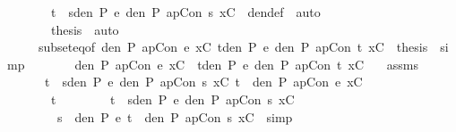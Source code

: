 \documentclass{llncs}
\newenvironment{isacode}
{\begin{list}{}{
\setlength{\leftmargin}{4pt}
\setlength{\rightmargin}{0pt}
\setlength{\listparindent}{0pt}\raggedright
\setlength{\itemsep}{0pt}
\setlength{\parsep}{0pt}
\normalfont\ttfamily }\item[]}
{\end{list}}
\begin{document}
{\begin{isacode}
\ \ \ \ \ \ \isamarkupfalse \ {\isachardoublequoteopen}t\ {\isasymin}\ {\isacharparenleft}{\isasymUnion}s{\isasymin}den\ P\ e{\isachardot}\ den\ P\ {\isacharparenleft}apCon\ s\ xC{\isacharparenright}{\isacharparenright}{\isachardoublequoteclose}\ \isamarkupfalse \ den{\isacharunderscore}def\ \isamarkupfalse \ auto\isanewline
\ \ \ \ \ \isacommand{{\isacharbraceright}}\isamarkupfalse \isanewline
\ \ \ \ \ \ \isamarkupfalse \ {\isacharquery}thesis\ \isamarkupfalse \ auto\isanewline
\ \ \ \ \isamarkupfalse \isanewline
\ \ \ \ \isamarkupfalse \ subset{\isacharunderscore}eq{\isacharbrackleft}of\ {\isachardoublequoteopen}den\ P\ {\isacharparenleft}apCon\ e\ xC{\isacharparenright}{\isachardoublequoteclose}\ {\isachardoublequoteopen}{\isasymUnion}t{\isasymin}den\ P\ e{\isachardot}\ den\ P\ {\isacharparenleft}apCon\ t\ xC{\isacharparenright}{\isachardoublequoteclose}{\isacharbrackright}\ \isamarkupfalse \ {\isacharquery}thesis\ \isamarkupfalse \ simp\isanewline
\ \ \isamarkupfalse \isanewline
\ \isamarkupfalse \isanewline
\ \ \isamarkupfalse \ {\isachardoublequoteopen}den\ P\ {\isacharparenleft}apCon\ e\ xC{\isacharparenright}\ {\isasymsupseteq}\ {\isacharparenleft}{\isasymUnion}t{\isasymin}den\ P\ e{\isachardot}\ den\ P\ {\isacharparenleft}apCon\ t\ xC{\isacharparenright}{\isacharparenright}{\isachardoublequoteclose}\isanewline
\ \ \isamarkupfalse \ assms\isanewline
\ \ \isamarkupfalse \ {\isacharminus}\isanewline
\ \ \ \ \isamarkupfalse \ {\isachardoublequoteopen}{\isasymforall}\ t\ {\isasymin}\ {\isacharparenleft}{\isasymUnion}s{\isasymin}den\ P\ e{\isachardot}\ den\ P\ {\isacharparenleft}apCon\ s\ xC{\isacharparenright}{\isacharparenright}{\isachardot}\ t\ {\isasymin}\ den\ P\ {\isacharparenleft}apCon\ e\ xC{\isacharparenright}{\isachardoublequoteclose}\isanewline
\ \ \ \ \isamarkupfalse \ {\isacharminus}\isanewline
\ \ \ \ \ \isacommand{{\isacharbraceleft}}\isamarkupfalse \isanewline
\ \ \ \ \ \ \isamarkupfalse \ t\isanewline
\ \ \ \ \ \ \isamarkupfalse \ \ {\isachardoublequoteopen}t\ {\isasymin}\ {\isacharparenleft}{\isasymUnion}s{\isasymin}den\ P\ e{\isachardot}\ den\ P\ {\isacharparenleft}apCon\ s\ xC{\isacharparenright}{\isacharparenright}{\isachardoublequoteclose}\isanewline
\ \ \ \ \ \ \isamarkupfalse \ {\isachardoublequoteopen}{\isasymexists}\ s\ {\isasymin}\ den\ P\ e{\isachardot}\ {\isacharparenleft}t\ {\isasymin}\ den\ P\ {\isacharparenleft}apCon\ s\ xC{\isacharparenright}{\isacharparenright}{\isachardoublequoteclose}\ \isamarkupfalse \ simp\isanewline

\end{isacode}}
\end{document}
